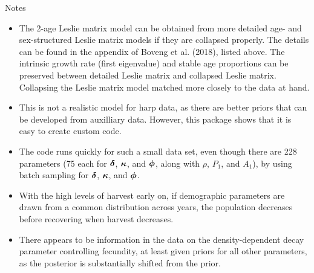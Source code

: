 \documentclass[mathserif,compress]{beamer}
\def\bdelta{\mbox{\boldmath $\delta$}}
\def\bphi{\mbox{\boldmath $\phi$}}
\def\bkappa{\mbox{\boldmath $\kappa$}}
\begin{document}

\begin{frame}
Notes

\begin{itemize}

  \item The 2-age Leslie matrix model can be obtained from more detailed age- and sex-structured Leslie matrix models if they are collapsed properly.  The details can be found in the appendix of Boveng et al. (2018), listed above.  The intrinsic growth rate (first eigenvalue) and stable age proportions can be preserved between detailed Leslie matrix and collapsed Leslie matrix.  Collapsing the Leslie matrix model matched more closely to the data at hand.
  
  \item This is not a realistic model for harp data, as there are better priors that can be developed from auxilliary data.  However, this package shows that it is easy to create custom code.
     
\end{itemize}

\end{frame}


\begin{frame}

\begin{itemize}
 
  \item The code runs quickly for such a small data set, even though there are 228 parameters (75 each for $\bdelta$, $\bkappa$, and $\bphi$, along with $\rho$, $P_{1}$, and $A_{1}$), by using batch sampling for $\bdelta$, $\bkappa$, and $\bphi$.

  \item With the high levels of harvest early on, if demographic parameters are drawn from a common distribution across years, the population decreases before recovering when harvest decreases.
  
  \item There appears to be information in the data on the density-dependent decay parameter controlling fecundity, at least given priors for all other parameters, as the posterior is substantially shifted from the prior.

\end{itemize}

\end{frame}
\end{document}
